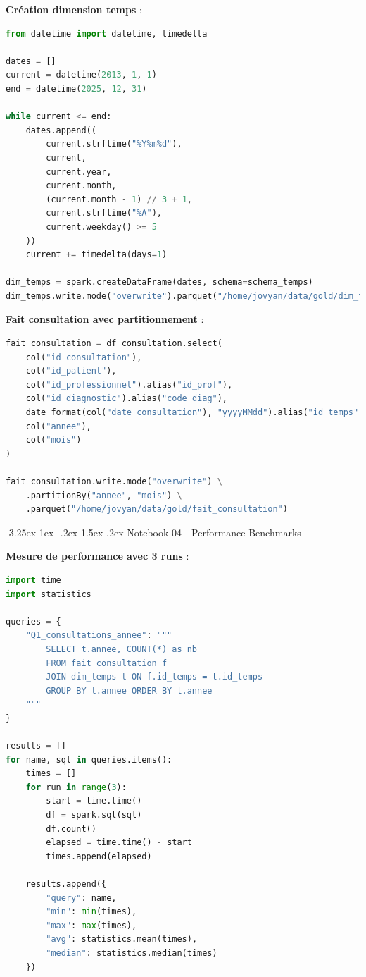 \documentclass[12pt,a4paper]{article}
\makeatletter
\renewcommand\subsection{\@startsection{subsection}{2}{\z@}%
    {-3.25ex\@plus -1ex \@minus -.2ex}%
    {1.5ex \@plus .2ex}%
    {\normalfont\large\bfseries\color{blue!50!black}}}
\makeatother
\begin{document}
\textbf{Création dimension temps} :
\begin{lstlisting}[language=Python, basicstyle=\tiny\ttfamily, breaklines=true]
from datetime import datetime, timedelta

dates = []
current = datetime(2013, 1, 1)
end = datetime(2025, 12, 31)

while current <= end:
    dates.append((
        current.strftime("%Y%m%d"),
        current,
        current.year,
        current.month,
        (current.month - 1) // 3 + 1,
        current.strftime("%A"),
        current.weekday() >= 5
    ))
    current += timedelta(days=1)

dim_temps = spark.createDataFrame(dates, schema=schema_temps)
dim_temps.write.mode("overwrite").parquet("/home/jovyan/data/gold/dim_temps")
\end{lstlisting}

\textbf{Fait consultation avec partitionnement} :
\begin{lstlisting}[language=Python, basicstyle=\tiny\ttfamily, breaklines=true]
fait_consultation = df_consultation.select(
    col("id_consultation"),
    col("id_patient"),
    col("id_professionnel").alias("id_prof"),
    col("id_diagnostic").alias("code_diag"),
    date_format(col("date_consultation"), "yyyyMMdd").alias("id_temps"),
    col("annee"),
    col("mois")
)

fait_consultation.write.mode("overwrite") \
    .partitionBy("annee", "mois") \
    .parquet("/home/jovyan/data/gold/fait_consultation")
\end{lstlisting}

\subsection{Notebook 04 - Performance Benchmarks}

\textbf{Mesure de performance avec 3 runs} :
\begin{lstlisting}[language=Python, basicstyle=\tiny\ttfamily, breaklines=true]
import time
import statistics

queries = {
    "Q1_consultations_annee": """
        SELECT t.annee, COUNT(*) as nb
        FROM fait_consultation f
        JOIN dim_temps t ON f.id_temps = t.id_temps
        GROUP BY t.annee ORDER BY t.annee
    """
}

results = []
for name, sql in queries.items():
    times = []
    for run in range(3):
        start = time.time()
        df = spark.sql(sql)
        df.count()
        elapsed = time.time() - start
        times.append(elapsed)

    results.append({
        "query": name,
        "min": min(times),
        "max": max(times),
        "avg": statistics.mean(times),
        "median": statistics.median(times)
    })
\end{lstlisting}
\end{document}
